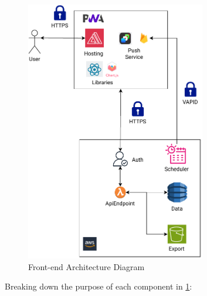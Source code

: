 \begin{figure}
    
    \centering
    \includegraphics[width=0.7\textwidth,keepaspectratio]{../images/frontend.pdf}
    \caption{Front-end Architecture Diagram}
    \label{fig:frontend}
    
\end{figure}
Breaking down the purpose of each component in \ref{fig:frontend}:
